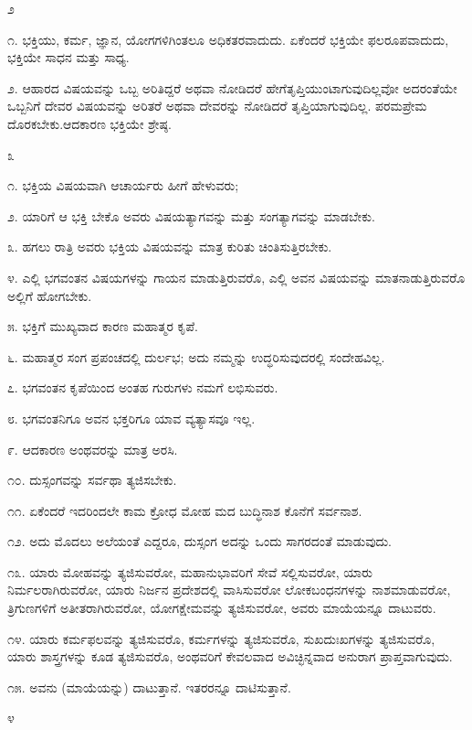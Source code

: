 \begin{center}
೨
\end{center}

೧. ಭಕ್ತಿಯು, ಕರ್ಮ, ಜ್ಞಾನ, ಯೋಗಗಳಿಗಿಂತಲೂ ಅಧಿಕತರವಾದುದು. ಏಕೆಂದರೆ ಭಕ್ತಿಯೇ ಫಲರೂಪವಾದುದು, ಭಕ್ತಿಯೇ ಸಾಧನ ಮತ್ತು ಸಾಧ್ಯ.

೨. ಆಹಾರದ ವಿಷಯವನ್ನು ಒಬ್ಬ ಅರಿತಿದ್ದರೆ ಅಥವಾ ನೋಡಿದರೆ ಹೇಗೆ\break ತೃಪ್ತಿಯುಂಟಾಗುವುದಿಲ್ಲವೋ ಅದರಂತೆಯೇ ಒಬ್ಬನಿಗೆ ದೇವರ ವಿಷಯವನ್ನು ಅರಿತರೆ ಅಥವಾ ದೇವರನ್ನು ನೋಡಿದರೆ ತೃಪ್ತಿಯಾಗುವುದಿಲ್ಲ. ಪರಮಪ್ರೇಮ ದೊರಕಬೇಕು.\break ಆದಕಾರಣ ಭಕ್ತಿಯೇ ಶ್ರೇಷ್ಠ.

\begin{center}
೩
\end{center}

೧. ಭಕ್ತಿಯ ವಿಷಯವಾಗಿ ಆಚಾರ್ಯರು ಹೀಗೆ ಹೇಳುವರು;

೨. ಯಾರಿಗೆ ಆ ಭಕ್ತಿ ಬೇಕೊ ಅವರು ವಿಷಯತ್ಯಾಗವನ್ನು ಮತ್ತು ಸಂಗತ್ಯಾಗವನ್ನು ಮಾಡಬೇಕು.

೩. ಹಗಲು ರಾತ್ರಿ ಅವರು ಭಕ್ತಿಯ ವಿಷಯವನ್ನು ಮಾತ್ರ ಕುರಿತು ಚಿಂತಿಸುತ್ತಿರಬೇಕು.

೪. ಎಲ್ಲಿ ಭಗವಂತನ ವಿಷಯಗಳನ್ನು ಗಾಯನ ಮಾಡುತ್ತಿರುವರೊ, ಎಲ್ಲಿ ಅವನ ವಿಷಯವನ್ನು ಮಾತನಾಡುತ್ತಿರುವರೊ ಅಲ್ಲಿಗೆ ಹೋಗಬೇಕು.

೫. ಭಕ್ತಿಗೆ ಮುಖ್ಯವಾದ ಕಾರಣ ಮಹಾತ್ಮರ ಕೃಪೆ.

೬. ಮಹಾತ್ಮರ ಸಂಗ ಪ್ರಪಂಚದಲ್ಲಿ ದುರ್ಲಭ; ಅದು ನಮ್ಮನ್ನು ಉದ್ಧರಿಸುವುದರಲ್ಲಿ ಸಂದೇಹವಿಲ್ಲ.

೭. ಭಗವಂತನ ಕೃಪೆಯಿಂದ ಅಂತಹ ಗುರುಗಳು ನಮಗೆ ಲಭಿಸುವರು.

೮. ಭಗವಂತನಿಗೂ ಅವನ ಭಕ್ತರಿಗೂ ಯಾವ ವ್ಯತ್ಯಾಸವೂ ಇಲ್ಲ.

೯. ಆದಕಾರಣ ಅಂಥವರನ್ನು ಮಾತ್ರ ಅರಸಿ.

೧೦. ದುಸ್ಸಂಗವನ್ನು ಸರ್ವಥಾ ತ್ಯಜಿಸಬೇಕು.

೧೧. ಏಕೆಂದರೆ ಇದರಿಂದಲೇ ಕಾಮ ಕ್ರೋಧ ಮೋಹ ಮದ ಬುದ್ಧಿನಾಶ ಕೊನೆಗೆ ಸರ್ವನಾಶ.

೧೨. ಅದು ಮೊದಲು ಅಲೆಯಂತೆ ಎದ್ದರೂ, ದುಸ್ಸಂಗ ಅದನ್ನು ಒಂದು ಸಾಗರದಂತೆ ಮಾಡುವುದು.

೧೩. ಯಾರು ಮೋಹವನ್ನು ತ್ಯಜಿಸುವರೋ, ಮಹಾನುಭಾವರಿಗೆ ಸೇವೆ ಸಲ್ಲಿಸುವರೋ, ಯಾರು ನಿರ್ಮಲರಾಗಿರುವರೋ, ಯಾರು ನಿರ್ಜನ ಪ್ರದೇಶದಲ್ಲಿ ವಾಸಿಸುವರೋ ಲೋಕಬಂಧನಗಳನ್ನು ನಾಶಮಾಡುವರೋ, ತ್ರಿಗುಣಗಳಿಗೆ ಅತೀತರಾಗಿರುವರೋ, ಯೋಗಕ್ಷೇಮವನ್ನು ತ್ಯಜಿಸುವರೋ, ಅವರು ಮಾಯೆಯನ್ನೂ ದಾಟುವರು.

೧೪. ಯಾರು ಕರ್ಮಫಲವನ್ನು ತ್ಯಜಿಸುವರೊ, ಕರ್ಮಗಳನ್ನು ತ್ಯಜಿಸುವರೊ, ಸುಖದುಃಖಗಳನ್ನು ತ್ಯಜಿಸುವರೊ, ಯಾರು ಶಾಸ್ತ್ರಗಳನ್ನು ಕೂಡ ತ್ಯಜಿಸುವರೊ, ಅಂಥವರಿಗೆ ಕೇವಲವಾದ ಅವಿಚ್ಛಿನ್ನವಾದ ಅನುರಾಗ ಪ್ರಾಪ್ತವಾಗುವುದು.

೧೫. ಅವನು (ಮಾಯೆಯನ್ನು) ದಾಟುತ್ತಾನೆ. ಇತರರನ್ನೂ ದಾಟಿಸುತ್ತಾನೆ.

\begin{center}
೪
\end{center}

